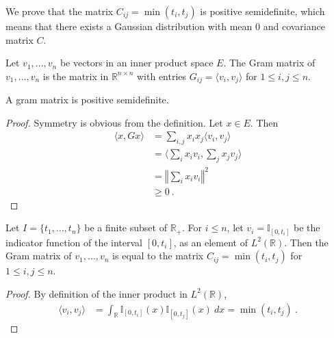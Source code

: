 



We prove that the matrix $C_{ij} = \min(t_i, t_j)$ is positive semidefinite, which means that there exists a Gaussian distribution with mean 0 and covariance matrix $C$.

\begin{definition}\label{def:gramMatrix}
Let $v_1, \ldots, v_n$ be vectors in an inner product space $E$.
The Gram matrix of $v_1, \ldots, v_n$ is the matrix in $\mathbb{R}^{n \times n}$ with entries $G_{ij} = \langle v_i, v_j \rangle$ for $1 \leq i,j \leq n$.
\end{definition}


\begin{lemma}\label{lem:posSemidef_gramMatrix}
A gram matrix is positive semidefinite.
\end{lemma}

\begin{proof}
Symmetry is obvious from the definition.
Let $x \in E$. Then
\begin{align*}
  \langle x, G x \rangle
  &= \sum_{i,j} x_i x_j \langle v_i, v_j \rangle
  \\
  &= \langle \sum_i x_i v_i, \sum_j x_j v_j \rangle
  \\
  &= \left\Vert \sum_i x_i v_i \right\Vert^2
  \\
  &\ge 0
  \: .
\end{align*}
\end{proof}


\begin{lemma}\label{lem:C_eq_gramMatrix}
Let $I = \{t_1, \ldots, t_n\}$ be a finite subset of $\mathbb{R}_+$.
For $i \le n$, let $v_i = \mathbb{I}_{[0, t_i]}$ be the indicator function of the interval $[0, t_i]$, as an element of $L^2(\mathbb{R})$.
Then the Gram matrix of $v_1, \ldots, v_n$ is equal to the matrix $C_{ij} = \min(t_i, t_j)$ for $1 \leq i,j \leq n$.
\end{lemma}

\begin{proof}
By definition of the inner product in $L^2(\mathbb{R})$,
\begin{align*}
  \langle v_i, v_j \rangle
  &= \int_{\mathbb{R}} \mathbb{I}_{[0, t_i]}(x) \mathbb{I}_{[0, t_j]}(x) \: dx
  = \min(t_i, t_j)
  \: .
\end{align*}
\end{proof}


